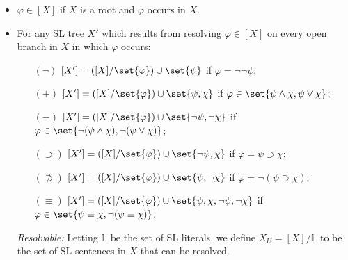 \begin{itemize}
      \item $\varphi\in[X]$ if $X$ is a root and $\varphi$ occurs in $X$.
      \item For any SL tree $X'$ which results from resolving $\varphi\in[X]$ on every open branch in $X$ in which $\varphi$ occurs:
        \begin{itemize}
          \item[$(\neg)$] $[X']=([X]/\set{\varphi})\cup\set{\psi}$ if $\varphi=\neg\neg\psi$;
          \item[$(+)$] $[X']=([X]/\set{\varphi})\cup\set{\psi,\chi}$ if $\varphi\in\set{\psi\wedge\chi,\psi\vee\chi}$;  
          \item[$(-)$] $[X']=([X]/\set{\varphi})\cup\set{\neg\psi,\neg\chi}$ if $\varphi\in\set{\neg(\psi\wedge\chi),\neg(\psi\vee\chi)}$;
          \item[$(\supset)$] $[X']=([X]/\set{\varphi})\cup\set{\neg\psi,\chi}$ if $\varphi=\psi\supset\chi$; 
          \item[$(\not\supset)$] $[X']=([X]/\set{\varphi})\cup\set{\psi,\neg\chi}$ if $\varphi=\neg(\psi\supset\chi)$; 
          \item[$(\equiv)$] $[X']=([X]/\set{\varphi})\cup\set{\psi,\chi, \neg\psi,\neg\chi}$ if $\varphi\in\set{\psi\equiv\chi,\neg(\psi\equiv\chi)}$.
        \end{itemize}
  \item[\it Resolvable:] Letting $\mathbb{L}$ be the set of SL literals, we define $X_U=[X]/\mathbb{L}$ to be the set of SL sentences in $X$ that can be resolved. 
\end{itemize}
